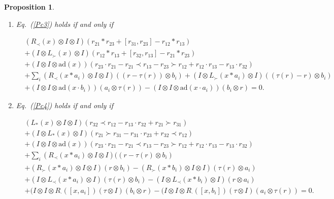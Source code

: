 \documentclass[12pt]{amsart}
\newtheorem{pro}[thm]{Proposition}
\theoremstyle{definition}
\begin{document}
\begin{pro}
\begin{enumerate}
\item \label{CNPB3} Eq.~(\ref{Pc3}) holds if and only if
\begin{small}
\begin{align}\label{CA3}&
(R_{\prec}(x)\otimes I\otimes I)(r_{21}\ast r_{23}+[r_{31},r_{23}]-r_{12}\ast r_{13})
\\&+(I \otimes L_{\succ}(x)\otimes I)(r_{12}\ast r_{13}+[r_{32},r_{13}]-r_{21}\ast r_{23})
\nonumber\\&+(I \otimes I\otimes \mathrm{ad}(x))(r_{23}\cdot r_{21}-r_{21}\prec r_{13}-r_{23}\succ r_{12}+r_{12}\cdot r_{13}-r_{13}\cdot r_{32})
\nonumber\\&+\sum_{i}(R_{\prec}(x\ast a_i)\otimes I \otimes I)((r-\tau(r))\otimes b_i)
+(I \otimes L_{\succ}(x\ast a_i)\otimes I)((\tau(r)-r)\otimes b_i)
\nonumber\\&+(I \otimes I\otimes \mathrm{ad}(x\cdot b_i))(a_i\otimes \tau(r))-(I \otimes I\otimes \mathrm{ad}(x\cdot a_i))(b_i\otimes r)
=0.\nonumber
\end{align}\end{small}

\item \label{CNPB4} Eq.~(\ref{Pc4}) holds if and only if
\begin{small}
\begin{align}\label{CA4}&
(L_{\ast}(x)\otimes I \otimes I)(r_{32}\prec r_{12}-r_{13}\cdot r_{32}+r_{21}\succ r_{31})
\\&+(I \otimes L_{\ast}(x)\otimes I)(r_{21}\succ r_{31}-r_{31}\cdot r_{23}+r_{32}\prec r_{12})
\nonumber\\&+(I \otimes I\otimes \mathrm{ad}(x))(r_{23}\cdot r_{21}-r_{21}\prec r_{13}-r_{23}\succ r_{12}+r_{12}\cdot r_{13}-r_{13}\cdot r_{32})
\nonumber\\&+\sum_{i}(R_{\prec}(x\ast a_i)\otimes I \otimes I)((r-\tau(r)\otimes b_i)
\nonumber\\&+(R_{\succ}(x\ast a_i)\otimes I \otimes I)(r\otimes b_i)-(R_{\succ}(x\ast b_i)\otimes I \otimes I)(\tau(r)\otimes a_i)
\nonumber\\&+( I \otimes L_{\prec}(x\ast a_i)\otimes I)(\tau(r)\otimes b_i)-
( I \otimes L_{\prec}(x\ast b_i)\otimes I)(r\otimes a_i)
\nonumber\\&+(I \otimes I\otimes R_{\cdot}([x,a_i])(\tau\otimes I)(b_i\otimes r)
-(I \otimes I\otimes R_{\cdot}([x,b_i])(\tau\otimes I)(a_i\otimes \tau(r))
=0.\nonumber
\end{align}\end{small}


\end{enumerate}
\end{pro}
\end{document}
